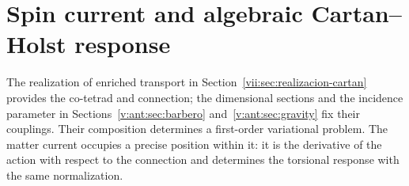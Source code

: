 %

\section{Spin current and algebraic Cartan--Holst response}
\label{vii:sec:corriente-respuesta-cartan}

The realization of enriched transport in
Section~\ref{vii:sec:realizacion-cartan} provides the co-tetrad and
connection; the dimensional sections and the incidence parameter in
Sections~\ref{v:ant:sec:barbero} and~\ref{v:ant:sec:gravity} fix their
couplings. Their composition determines a first-order variational
problem. The matter current occupies a precise position within it:
it is the derivative of the action with respect to the connection and
determines the torsional response with the same normalization.

